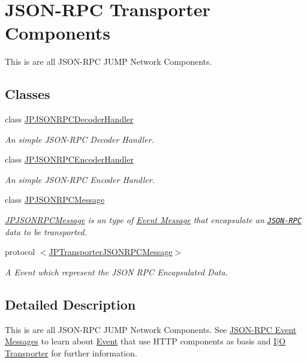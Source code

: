 \hypertarget{a00087}{
\section{JSON-\/RPC Transporter Components}
\label{a00087}
}


This is are all JSON-\/RPC JUMP Network Components.  


\subsection*{Classes}
\begin{DoxyCompactItemize}
\item 
class \hyperlink{a00015}{JPJSONRPCDecoderHandler}
\begin{DoxyCompactList}\small\item\em An simple JSON-\/RPC Decoder Handler. \item\end{DoxyCompactList}\item 
class \hyperlink{a00016}{JPJSONRPCEncoderHandler}
\begin{DoxyCompactList}\small\item\em An simple JSON-\/RPC Encoder Handler. \item\end{DoxyCompactList}\item 
class \hyperlink{a00018}{JPJSONRPCMessage}
\begin{DoxyCompactList}\small\item\em \hyperlink{a00018}{JPJSONRPCMessage} is an type of \hyperlink{a00006}{Event Message} that encapsulate an \href{http://en.wikipedia.org/wiki/JSON-RPC}{\tt JSON-\/RPC} data to be transported. \item\end{DoxyCompactList}\item 
protocol \hyperlink{a00041}{$<$JPTransporterJSONRPCMessage$>$}
\begin{DoxyCompactList}\small\item\em A Event which represent the JSON RPC Encapsulated Data. \item\end{DoxyCompactList}\end{DoxyCompactItemize}


\subsection{Detailed Description}
This is are all JSON-\/RPC JUMP Network Components. See \hyperlink{a00008}{JSON-\/RPC Event Messages} to learn about \hyperlink{a00005}{Event} that use HTTP components as basis and \hyperlink{a00002}{I$|$O Transporter} for further information. 